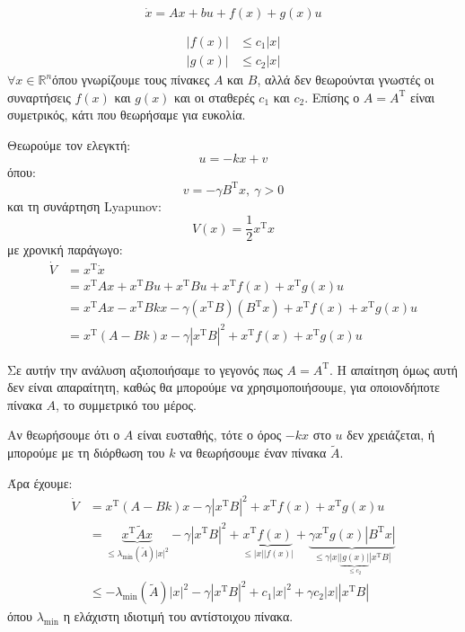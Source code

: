 \documentclass[11pt,a4paper,notitlepage,fleqn]{article}
\let\mytodo\todo
\renewcommand{\todo}[1]{\par\mytodo[inline,noline]{#1}}
\begin{document}
\[
\dot x = Ax + bu + f(x) + g(x) u
\]

\begin{align*}
	\left| f(x) \right| &\leq c_1|x| \\
	\left| g(x) \right| &\leq c_2|x|
\end{align*}
\( \forall x \in \mathbb R^n \)όπου γνωρίζουμε τους πίνακες \( A \) και \( B \), αλλά δεν
θεωρούνται γνωστές οι συναρτήσεις \( f(x) \) και \( g(x) \) και
οι σταθερές \( c_1 \) και \( c_2 \). Επίσης ο \( A = A^{\mathrm T} \) είναι
συμετρικός, κάτι που θεωρήσαμε για ευκολία.

Θεωρούμε τον ελεγκτή:
\[
u = -kx + v
\]
όπου:
\[
v = -γB^{\mathrm T}x,\ γ > 0
\]
και τη συνάρτηση Lyapunov:
\[
V(x) = \frac{1}{2} x^{\mathrm T} x
\]
με χρονική παράγωγο:
\begin{align*}
	\dot V &= x^{\mathrm T} \dot x
	\\ &= x^{\mathrm T} A x + x^{\mathrm T} B u + x^{\mathrm T}B u
	+ x^{\mathrm T} f(x) + x^{\mathrm T} g(x)u
	\\ &= x^{\mathrm T} A x - x^{\mathrm T} B k x - \gamma(x^{\mathrm T}B)(B^{\mathrm T} x) + x^{\mathrm T}f(x) + x^{\mathrm T}g(x)u
	\\ &= x^{\mathrm T}(A-Bk)x - \gamma\left| x^{\mathrm T}B \right|^2
	+ x^{\mathrm T}f(x) + x^{\mathrm T}g(x)u
\end{align*}

Σε αυτήν την ανάλυση αξιοποιήσαμε το γεγονός πως \( A=A^{\mathrm T} \).
Η απαίτηση όμως αυτή δεν είναι απαραίτητη, καθώς θα μπορούμε να χρησιμοποιήσουμε, για οποιονδήποτε πίνακα \( A \), το συμμετρικό του μέρος.

Αν θεωρήσουμε ότι ο \( A \) είναι ευσταθής, τότε ο όρος \( -kx \) στο \( u \) δεν χρειάζεται, ή μπορούμε με τη διόρθωση του \( k \) να θεωρήσουμε έναν πίνακα \( \tilde A \). \todo{what?}

Άρα έχουμε:
\begin{align*}
	\dot V &= x^{\mathrm T}(A-Bk)x
	- \gamma\left| x^{\mathrm T}B \right|^2
	+ x^{\mathrm T}f(x)
	+ x^{\mathrm T}g(x)u
	\\
    &=	\underbrace{x^{\mathrm T} \tilde A x}_{\leq \lambda_{\min} (\tilde A)|x|^2}
	- \gamma\left| x^{\mathrm T}B \right|^2
	+ \underbrace{x^{\mathrm T}f(x) }_{\leq |x|\left|f(x)\right|}
	+ \underbrace{\gamma x^{\mathrm T} g(x) \left| B^{\mathrm T} x \right|}_{\leq \gamma|x|\underbrace{\left| g(x) \right|}_{\leq c_2} \left| x^{\mathrm T} B \right|}
	\\ &\leq -\lambda_{\min}(\tilde A) |x|^2 - \gamma\left|x^{\mathrm T} B\right|^2  + c_1 |x|^2 + \gamma c_2|x|\left| x^{\mathrm{T}}B \right|
\end{align*}
όπου \( \lambda_{\min} \) η ελάχιστη ιδιοτιμή του αντίστοιχου πίνακα.
\end{document}
